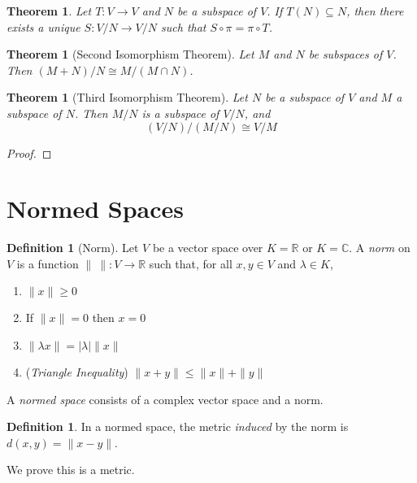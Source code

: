\documentclass{book}
\newtheorem{thm}[lm]{Theorem}
\theoremstyle{definition}
\newtheorem{df}[lm]{Definition}
\begin{document}
  \begin{thm}
    Let $T : V \rightarrow V$ and $N$ be a subspace of $V$. If $T(N) \subseteq 
    N$, 
    then there exists a unique $S : V / N \rightarrow V / N$ such that $S \circ 
    \pi 
    = \pi \circ T$.
  \end{thm}
  
  \begin{thm}[Second Isomorphism Theorem]
    Let $M$ and $N$ be subspaces of $V$. Then $(M+N)/N \cong M/(M\cap N)$.
  \end{thm}
  
  \begin{thm}[Third Isomorphism Theorem]
    Let $N$ be a subspace of $V$ and $M$ a subspace of $N$. Then $M/N$ is a 
    subspace of $V/N$, and
    \[ (V/N)/(M/N) \cong V/M \]
  \end{thm}
  
  \begin{proof}
  \end{proof}
  
  \section{Normed Spaces}
  
  \begin{df}[Norm]
    Let $V$ be a vector space over $K = \mathbb{R}$ or $K = \mathbb{C}$. A 
    \emph{norm} on $V$ is a function $\| \
    \| : V \rightarrow \mathbb{R}$ such that, for all $x, y \in V$ and $\lambda 
    \in
    K$,
    \begin{enumerate}
      \item $\| x \| \geq 0$
      \item If $\| x \| = 0$ then $x=0$
      \item $\| \lambda x \| = | \lambda | \| x \|$
      \item (\emph{Triangle Inequality}) $\| x + y \| \leq \| x \| + \| y \|$
    \end{enumerate}
    A \emph{normed space} consists of a complex vector space and a norm.
  \end{df}
  
  \begin{df}
    In a normed space, the metric \emph{induced} by the norm is $d(x, y) = \| x 
    - 
    y \|$.
    
    We prove this is a metric.
  \end{df}
  
\end{document}

